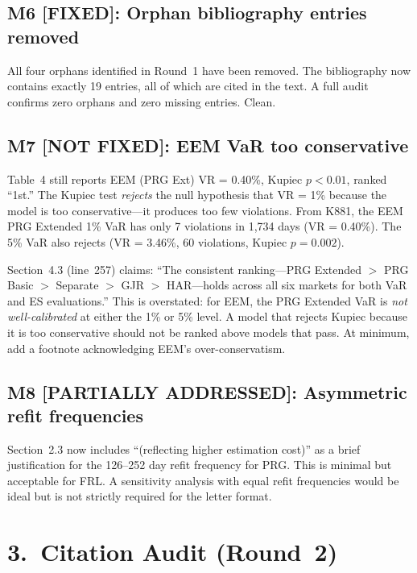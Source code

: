 \documentclass[12pt,a4paper]{article}
\begin{document}
\subsection*{\textcolor{okgreen}{M6 [FIXED]: Orphan bibliography entries removed}}

All four orphans identified in Round~1 have been removed. The bibliography now contains exactly 19 entries, all of which are cited in the text. A full audit confirms zero orphans and zero missing entries. \textcolor{okgreen}{Clean.}

\subsection*{\textcolor{warncolor}{M7 [NOT FIXED]: EEM VaR too conservative}}

Table~4 still reports EEM (PRG Ext) VR = 0.40\%, Kupiec $p < 0.01$, ranked ``1st.'' The Kupiec test \emph{rejects} the null hypothesis that VR = 1\% because the model is too conservative---it produces too few violations. From K881, the EEM PRG Extended 1\% VaR has only 7 violations in 1,734 days (VR = 0.40\%). The 5\% VaR also rejects (VR = 3.46\%, 60 violations, Kupiec $p = 0.002$).

Section~4.3 (line~257) claims: ``The consistent ranking---PRG Extended $>$ PRG Basic $>$ Separate $>$ GJR $>$ HAR---holds across all six markets for both VaR and ES evaluations.'' This is overstated: for EEM, the PRG Extended VaR is \emph{not well-calibrated} at either the 1\% or 5\% level. A model that rejects Kupiec because it is too conservative should not be ranked above models that pass. At minimum, add a footnote acknowledging EEM's over-conservatism.

\subsection*{\textcolor{okgreen}{M8 [PARTIALLY ADDRESSED]: Asymmetric refit frequencies}}

Section~2.3 now includes ``(reflecting higher estimation cost)'' as a brief justification for the 126--252 day refit frequency for PRG. This is minimal but acceptable for FRL. A sensitivity analysis with equal refit frequencies would be ideal but is not strictly required for the letter format.


\section*{3.\ Citation Audit (Round~2)}
\end{document}
